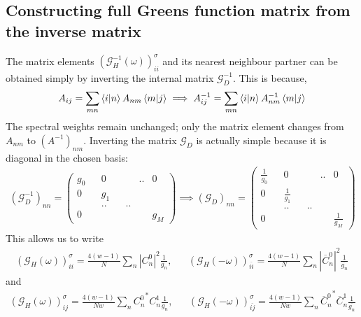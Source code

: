 \documentclass{article}
\numberwithin{equation}{section}
\begin{document}
\subsection{Constructing full Greens function matrix from the inverse matrix}
The matrix elements $\left(\mathcal{G}_{H}^{-1}(\omega)\right)_{ii}^\sigma$ and its nearest neighbour partner can be obtained simply by inverting the internal matrix $\mathcal{G}^{-1}_D$. This is because,
\begin{equation}\begin{aligned}
	A_{ij} = \sum_{mn}\braket{i | n} A_{nm} \braket{m|j} \implies A^{-1}_{ij} = \sum_{mn}\braket{i|n} A^{-1}_{nm} \braket{m|j}
\end{aligned}\end{equation}
The spectral weights remain unchanged; only the matrix element changes from $A_{nm}$ to $(A^{-1})_{nm}$. Inverting the matrix $\mathcal{G}_D$ is actually simple because it is diagonal in the chosen basis:
\begin{equation}\begin{aligned}
	\left(\mathcal{G}^{-1}_D\right)_{nn} = \begin{pmatrix} g_{0} && 0 && &..& 0\\ 0 && g_{1} && && \\ &&..&& .. &&  \\ 0 &&&&&& g_{M} \end{pmatrix} \implies \left(\mathcal{G}_D\right)_{nn} = \begin{pmatrix} \frac{1}{g_{0}} && 0 && &..& 0\\ 0 && \frac{1}{g_{1}} && && \\ &&..&& .. &&  \\ 0 &&&&&& \frac{1}{g_{M}} \end{pmatrix}
\end{aligned}\end{equation}
This allows us to write
\begin{equation}\begin{aligned}
	\label{G_mat_loc}
	\left(\mathcal{G}_{H}(\omega)\right)_{ii}^\sigma = \frac{4(w-1)}{N}\sum_{n} |C^0_{n}|^2 \frac{1}{g_n}, && \left(\mathcal{G}_{H}(-\omega)\right)_{\overline{ii}}^\sigma = \frac{4(w-1)}{N}\sum_{n} |\overline C^0_{n}|^2 \frac{1}{\overline{g_n}}
\end{aligned}\end{equation}
and
\begin{equation}\begin{aligned}
	\label{G_mat_nn}
	\left(\mathcal{G}_{H}(\omega)\right)_{ij}^\sigma = \frac{4(w-1)}{Nw}\sum_{n} {C^0_{n}}^* C^1_{n} \frac{1}{g_n}, && \left(\mathcal{G}_{H}(-\omega)\right)_{\overline{ij}}^\sigma = \frac{4(w-1)}{Nw}\sum_{n} {\overline C^0_{n}}^* \overline C^1_{n} \frac{1}{\overline{g_n}}
\end{aligned}\end{equation}
\end{document}
